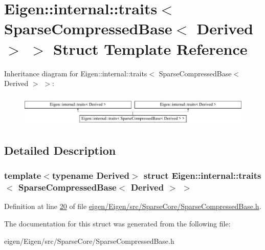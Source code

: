 \hypertarget{struct_eigen_1_1internal_1_1traits_3_01_sparse_compressed_base_3_01_derived_01_4_01_4}{}\section{Eigen\+:\+:internal\+:\+:traits$<$ Sparse\+Compressed\+Base$<$ Derived $>$ $>$ Struct Template Reference}
\label{struct_eigen_1_1internal_1_1traits_3_01_sparse_compressed_base_3_01_derived_01_4_01_4}
Inheritance diagram for Eigen\+:\+:internal\+:\+:traits$<$ Sparse\+Compressed\+Base$<$ Derived $>$ $>$\+:\begin{figure}[H]
\begin{center}
\leavevmode
\includegraphics[height=1.538461cm]{struct_eigen_1_1internal_1_1traits_3_01_sparse_compressed_base_3_01_derived_01_4_01_4}
\end{center}
\end{figure}


\subsection{Detailed Description}
\subsubsection*{template$<$typename Derived$>$\newline
struct Eigen\+::internal\+::traits$<$ Sparse\+Compressed\+Base$<$ Derived $>$ $>$}



Definition at line \hyperlink{eigen_2_eigen_2src_2_sparse_core_2_sparse_compressed_base_8h_source_l00020}{20} of file \hyperlink{eigen_2_eigen_2src_2_sparse_core_2_sparse_compressed_base_8h_source}{eigen/\+Eigen/src/\+Sparse\+Core/\+Sparse\+Compressed\+Base.\+h}.



The documentation for this struct was generated from the following file\+:\begin{DoxyCompactItemize}
\item 
eigen/\+Eigen/src/\+Sparse\+Core/\+Sparse\+Compressed\+Base.\+h\end{DoxyCompactItemize}
